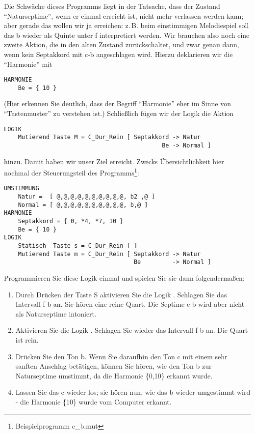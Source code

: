 Die Schwäche
dieses Programms liegt in der Tatsache, dass der Zustand
"`Naturseptime"', wenn er einmal erreicht ist, nicht mehr verlassen
werden kann; aber gerade das wollen wir ja erreichen: z.\,B. beim
einstimmigen Melodiespiel soll das b wieder als Quinte unter f
interpretiert werden. Wir brauchen also noch eine zweite Aktion,
die in den alten Zustand zurückschaltet, und zwar genau dann, wenn
kein Septakkord mit c-b angeschlagen wird.
Hierzu deklarieren wir die "`Harmonie"'  mit
\begin{verbatim}
HARMONIE
    Be = { 10 }
\end{verbatim}
(Hier erkennen Sie deutlich, dass der Begriff "`Harmonie"' eher im
Sinne von "`Tastenmuster"' zu verstehen ist.) Schließlich fügen wir
der Logik die Aktion
\begin{verbatim}
LOGIK
    Mutierend Taste M = C_Dur_Rein [ Septakkord -> Natur
                                             Be -> Normal ]
\end{verbatim}
hinzu. Damit haben wir unser Ziel erreicht. Zwecks Übersichtlichkeit
hier nochmal der Steuerungsteil des
Programms\footnote{Beispielprogramm c\_b.mut}:
\label{CB}
\begin{verbatim}
UMSTIMMUNG
    Natur =  [ @,@,@,@,@,@,@,@,@,@, b2 ,@ ]
    Normal = [ @,@,@,@,@,@,@,@,@,@, b,@ ]
HARMONIE
    Septakkord = { 0, *4, *7, 10 }
    Be = { 10 }
LOGIK
    Statisch  Taste s = C_Dur_Rein [ ]
    Mutierend Taste m = C_Dur_Rein [ Septakkord -> Natur
                                     Be         -> Normal ]
\end{verbatim}
Programmieren Sie diese Logik einmal und spielen Sie sie dann
folgendermaßen:
\begin{enumerate}
\item Durch Drücken der Taste S aktivieren Sie die Logik . Schlagen Sie das Intervall f-b an. Sie hören eine reine
  Quart. Die Septime c-b wird aber nicht als Naturseptime intoniert.
\item Aktivieren Sie die Logik . Schlagen Sie wieder
  das Intervall f-b an. Die Quart ist rein.
\item Drücken Sie den Ton b. Wenn Sie daraufhin den Ton c mit einem
  sehr sanften Anschlag betätigen, können Sie hören, wie \mutabor{} den
  Ton b zur Naturseptime umstimmt, da die Harmonie \{0,10\} erkannt
  wurde.
\item Lassen Sie das c wieder los; sie hören nun, wie das b wieder
  umgestimmt wird - die Harmonie \{10\} wurde vom Computer erkannt.
\end{enumerate}
